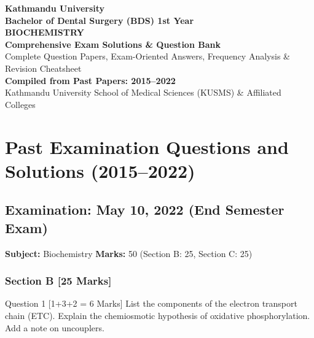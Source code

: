 \documentclass[11pt,a4paper]{article}
\begin{document}
\begin{titlepage}
    \centering
    \vspace*{2cm}
    {\Huge \textbf{Kathmandu University}}\\[0.5cm]
    {\LARGE \textbf{Bachelor of Dental Surgery (BDS) 1st Year}}\\[1.5cm]
    {\Huge \textbf{BIOCHEMISTRY}}\\[0.8cm]
    {\Large \textbf{Comprehensive Exam Solutions \& Question Bank}}\\[0.5cm]
    {\large Complete Question Papers, Exam-Oriented Answers, Frequency Analysis \& Revision Cheatsheet}\\[2cm]
    \vfill
    {\large \textbf{Compiled from Past Papers: 2015--2022}}\\[0.5cm]
    {\small Kathmandu University School of Medical Sciences (KUSMS) \& Affiliated Colleges}
    \vspace*{1.5cm}
\end{titlepage}

\tableofcontents
\newpage

\section{Past Examination Questions and Solutions (2015--2022)}

\subsection{Examination: May 10, 2022 (End Semester Exam)}
\textbf{Subject:} Biochemistry \quad \textbf{Marks:} 50 (Section B: 25, Section C: 25)

\subsubsection{Section B [25 Marks]}

\begin{qbox}{Question 1 [1+3+2 = 6 Marks]}
List the components of the electron transport chain (ETC). Explain the chemiosmotic hypothesis of oxidative phosphorylation. Add a note on uncouplers.
\end{qbox}
\end{document}

